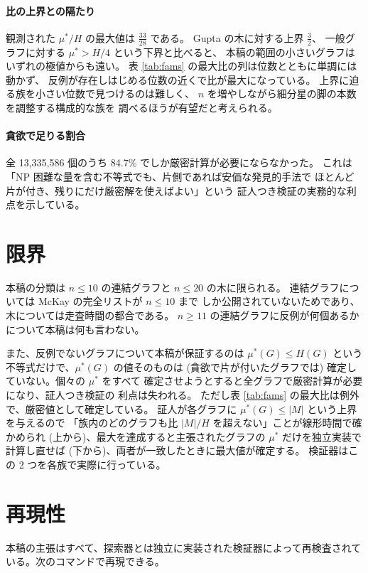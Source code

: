 \documentclass[paper=a4,fontsize=10.5pt,jafontsize=10.5pt]{jlreq}
\theoremstyle{plain}
\theoremstyle{definition}
\begin{document}
\paragraph{比の上界との隔たり}
観測された $\mu^*/H$ の最大値は $\frac{33}{28}$ である。
Gupta \cite{gupta} の木に対する上界 $\tfrac{3}{2}$、
一般グラフに対する $\mu^* > H/4$ という下界と比べると、
本稿の範囲の小さいグラフはいずれの極値からも遠い。
表 \ref{tab:fams} の最大比の列は位数とともに単調には動かず、
反例が存在しはじめる位数の近くで比が最大になっている。
上界に迫る族を小さい位数で見つけるのは難しく、
$n$ を増やしながら細分星の脚の本数を調整する構成的な族を
調べるほうが有望だと考えられる。

\paragraph{貪欲で足りる割合}
全 13,335,586 個のうち 84.7\% でしか厳密計算が必要にならなかった。
これは「NP 困難な量を含む不等式でも、片側であれば安価な発見的手法で
ほとんど片が付き、残りにだけ厳密解を使えばよい」という
証人つき検証の実務的な利点を示している。

\section{限界}

本稿の分類は $n \le 10$ の連結グラフと $n \le 20$ の木に限られる。
連結グラフについては McKay \cite{mckay} の完全リストが $n \le 10$ まで
しか公開されていないためであり、木については走査時間の都合である。
$n \ge 11$ の連結グラフに反例が何個あるかについて本稿は何も言わない。

また、反例でないグラフについて本稿が保証するのは
$\mu^*(G) \le H(G)$ という不等式だけで、$\mu^*(G)$ の値そのものは
(貪欲で片が付いたグラフでは) 確定していない。個々の $\mu^*$ をすべて
確定させようとすると全グラフで厳密計算が必要になり、証人つき検証の
利点は失われる。
ただし表 \ref{tab:fams} の最大比は例外で、厳密値として確定している。
証人が各グラフに $\mu^*(G) \le |M|$ という上界を与えるので
「族内のどのグラフも比 $|M|/H$ を超えない」ことが線形時間で確かめられ
(上から)、最大を達成すると主張されたグラフの $\mu^*$ だけを独立実装で
計算し直せば (下から)、両者が一致したときに最大値が確定する。
検証器はこの 2 つを各族で実際に行っている。


\section*{再現性}
本稿の主張はすべて、探索器とは独立に実装された検証器によって再検査されている。次のコマンドで再現できる。
\end{document}
